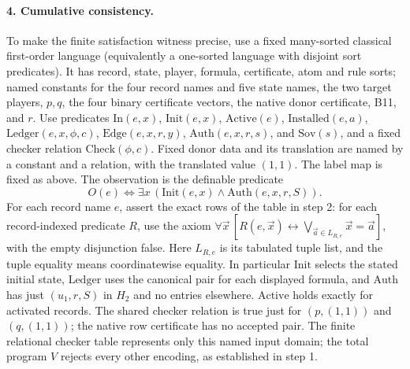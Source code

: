 \documentclass[11pt]{article}
\theoremstyle{definition}\newtheorem{definition}[theorem]{Definition}
\begin{document}
\paragraph{4. Cumulative consistency.} To make the finite satisfaction witness precise, use a fixed many-sorted classical first-order language (equivalently a one-sorted language with disjoint sort predicates). It has record, state, player, formula, certificate, atom and rule sorts; named constants for the four record names and five state names, the two target players, $p,q$, the four binary certificate vectors, the native donor certificate, B11, and $r$. Use predicates $\mathrm{In}(e,x)$, $\mathrm{Init}(e,x)$, $\mathrm{Active}(e)$, $\mathrm{Installed}(e,a)$, $\mathrm{Ledger}(e,x,\phi,c)$, $\mathrm{Edge}(e,x,r,y)$, $\mathrm{Auth}(e,x,r,s)$, and $\mathrm{Sov}(s)$, and a fixed checker relation $\mathrm{Check}(\phi,c)$. Fixed donor data and its translation are named by a constant and a relation, with the translated value $(1,1)$. The label map is fixed as above. The observation is the definable predicate
\[
 O(e)\iff\exists x\,(\mathrm{Init}(e,x)\land \mathrm{Auth}(e,x,r,S)).
\]
For each record name $e$, assert the exact rows of the table in step 2: for each record-indexed predicate $R$, use the axiom $\forall\vec x\,[R(e,\vec x)\leftrightarrow\bigvee_{\vec a\in L_{R,e}}\vec x=\vec a]$, with the empty disjunction false. Here $L_{R,e}$ is its tabulated tuple list, and the tuple equality means coordinatewise equality. In particular $\mathrm{Init}$ selects the stated initial state, $\mathrm{Ledger}$ uses the canonical pair for each displayed formula, and $\mathrm{Auth}$ has just $(u_1,r,S)$ in $H_2$ and no entries elsewhere. $\mathrm{Active}$ holds exactly for activated records. The shared checker relation is true just for $(p,(1,1))$ and $(q,(1,1))$; the native row certificate has no accepted pair. The finite relational checker table represents only this named input domain; the total program $V$ rejects every other encoding, as established in step 1.
\end{document}
